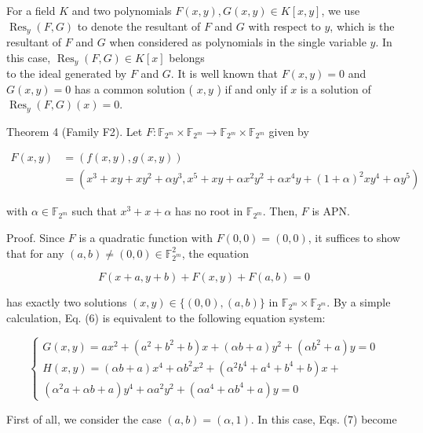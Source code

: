 \documentclass[10pt]{article}
\begin{document}
For a field $K$ and two polynomials $F(x, y), G(x, y) \in K[x, y]$, we use $\operatorname{Res}_{y}(F, G)$ to denote the resultant of $F$ and $G$ with respect to $y$, which is the resultant of $F$ and $G$ when considered as polynomials in the single variable $y$. In this case, $\operatorname{Res}_{y}(F, G) \in K[x]$ belongs\\
to the ideal generated by $F$ and $G$. It is well known that $F(x, y)=0$ and $G(x, y)=0$ has a common solution ( $x, y$ ) if and only if $x$ is a solution of $\operatorname{Res}_{y}(F, G)(x)=0$.

Theorem 4 (Family F2). Let $F: \mathbb{F}_{2^{m}} \times \mathbb{F}_{2^{m}} \rightarrow \mathbb{F}_{2^{m}} \times \mathbb{F}_{2^{m}}$ given by

$$
\begin{aligned}
F(x, y) & =(f(x, y), g(x, y)) \\
& =\left(x^{3}+x y+x y^{2}+\alpha y^{3}, x^{5}+x y+\alpha x^{2} y^{2}+\alpha x^{4} y+(1+\alpha)^{2} x y^{4}+\alpha y^{5}\right)
\end{aligned}
$$

with $\alpha \in \mathbb{F}_{2^{m}}$ such that $x^{3}+x+\alpha$ has no root in $\mathbb{F}_{2^{m}}$. Then, $F$ is APN.

Proof. Since $F$ is a quadratic function with $F(0,0)=(0,0)$, it suffices to show that for any $(a, b) \neq(0,0) \in \mathbb{F}_{2^{m}}^{2}$, the equation


\begin{equation*}
F(x+a, y+b)+F(x, y)+F(a, b)=0 \tag{6}
\end{equation*}


has exactly two solutions $(x, y) \in\{(0,0),(a, b)\}$ in $\mathbb{F}_{2^{m}} \times \mathbb{F}_{2^{m}}$. By a simple calculation, Eq. (6) is equivalent to the following equation system:

\[
\left\{\begin{array}{l}
G(x, y)=a x^{2}+\left(a^{2}+b^{2}+b\right) x+(\alpha b+a) y^{2}+\left(\alpha b^{2}+a\right) y=0  \tag{7.1}\\
H(x, y)=(\alpha b+a) x^{4}+\alpha b^{2} x^{2}+\left(\alpha^{2} b^{4}+a^{4}+b^{4}+b\right) x+ \\
\left(\alpha^{2} a+\alpha b+a\right) y^{4}+\alpha a^{2} y^{2}+\left(\alpha a^{4}+\alpha b^{4}+a\right) y=0
\end{array}\right.
\]

First of all, we consider the case $(a, b)=(\alpha, 1)$. In this case, Eqs. (7) become
\end{document}
